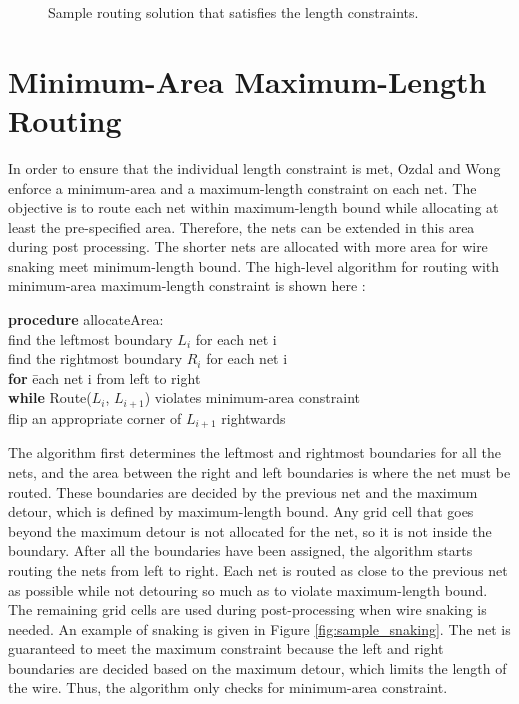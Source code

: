 \begin{figure}[here]
  \begin{center}
  \end{center}
  \caption{Sample routing solution that satisfies the length constraints.}
  \label{fig:sample_sol}
\end{figure}

\section{Minimum-Area Maximum-Length Routing}\label{sec-minarea}
In order to ensure that the individual length constraint is met, Ozdal and Wong enforce a minimum-area and a maximum-length constraint on each net. The objective is to route each net within maximum-length bound while allocating at least the pre-specified area. Therefore, the nets can be extended in this area during post processing. The shorter nets are allocated with more area for wire snaking meet minimum-length bound. The high-level algorithm for routing with minimum-area maximum-length constraint is shown here \cite{IEEEexample:ozdal_wong}:%


\begin{tabbing}
{\bf pro}\={\bf cedure} allocateArea:\\
\> find the leftmost boundary $L_i$ for each net i\\
\> find the rightmost boundary $R_i$ for each net i\\
\> {\bf for} \=each net i from left to right  \\
\> \> {\bf whi}\={\bf le} Route($L_i$, $L_{i+1}$) violates minimum-area constraint\\     
\> \> \> flip an appropriate corner of $L_{i+1}$ rightwards%
\end{tabbing}


The algorithm first determines the leftmost and rightmost boundaries for all the nets, and the area between the right and left boundaries is where the net must be routed. These boundaries are decided by the previous net and the maximum detour, which is defined by maximum-length bound. Any grid cell that goes beyond the maximum detour is not allocated for the net, so it is not inside the boundary. After all the boundaries have been assigned, the algorithm starts routing the nets from left to right. Each net is routed as close to the previous net as possible while not detouring so much as to violate maximum-length bound. The remaining grid cells are used during post-processing when wire snaking is needed. An example of snaking is given in Figure \ref{fig:sample_snaking}. The net is guaranteed to meet the maximum constraint because the left and right boundaries are decided based on the maximum detour, which limits the length of the wire. Thus, the algorithm only checks for minimum-area constraint.

